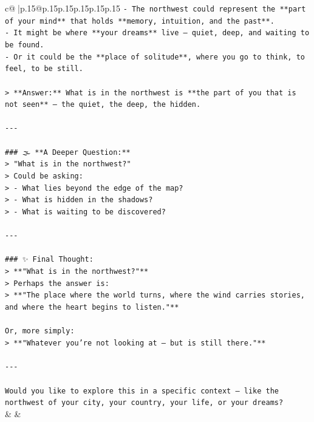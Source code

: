 \documentclass{article}
\begin{document}
{\begin{supertabular}{c@{$\;$}|p{.15\linewidth}@{}p{.15\linewidth}p{.15\linewidth}p{.15\linewidth}p{.15\linewidth}p{.15\linewidth}}
{{{\texttt{{-} The northwest could represent the **part of your mind** that holds **memory, intuition, and the past**.  } \\
\texttt{{-} It might be where **your dreams** live — quiet, deep, and waiting to be found.  } \\
\texttt{{-} Or it could be the **place of solitude**, where you go to think, to feel, to be still.} \\
\\ 
\texttt{> **Answer:** What is in the northwest is **the part of you that is not seen** — the quiet, the deep, the hidden.} \\
\\ 
\texttt{{-}{-}{-}} \\
\\ 
\texttt{\#\#\# 🌫️ **A Deeper Question:**} \\
\texttt{> "What is in the northwest?"  } \\
\texttt{> Could be asking:  } \\
\texttt{> {-} What lies beyond the edge of the map?  } \\
\texttt{> {-} What is hidden in the shadows?  } \\
\texttt{> {-} What is waiting to be discovered?} \\
\\ 
\texttt{{-}{-}{-}} \\
\\ 
\texttt{\#\#\# ✨ Final Thought:} \\
\texttt{> **"What is in the northwest?"**  } \\
\texttt{> Perhaps the answer is:  } \\
\texttt{> **"The place where the world turns, where the wind carries stories, and where the heart begins to listen."**} \\
\\ 
\texttt{Or, more simply:  } \\
\texttt{> **"Whatever you’re not looking at — but is still there."**} \\
\\ 
\texttt{{-}{-}{-}} \\
\\ 
\texttt{Would you like to explore this in a specific context — like the northwest of your city, your country, your life, or your dreams?} \\
            }
        }
    }
    & & \\ \\


\end{supertabular}}
\end{document}
